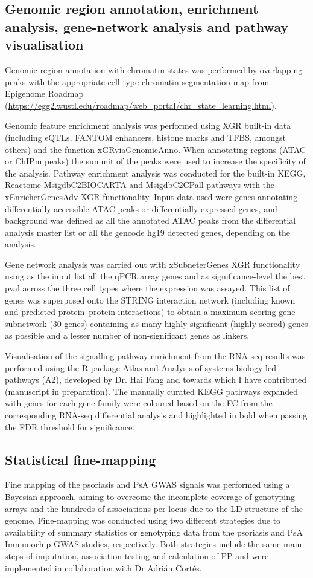 \subsection{Genomic region annotation, enrichment analysis, gene-network analysis and pathway visualisation }
Genomic region annotation with chromatin states was performed by overlapping peaks with the appropriate cell type chromatin segmentation map from Epigenome Roadmap (\url{https://egg2.wustl.edu/roadmap/web_portal/chr_state_learning.html}).

Genomic feature enrichment analysis was performed using XGR built-in data (including eQTLs, FANTOM enhancers, histone marks and TFBS, amongst others) and the function xGRviaGenomicAnno. When annotating regions (ATAC or ChIPm peaks) the summit of the peaks were used to increase the specificity of the analysis. Pathway enrichment analysis was conducted for the built-in KEGG, Reactome MsigdbC2BIOCARTA and MsigdbC2CPall pathways with the xEnricherGenesAdv XGR functionality. Input data used were genes annotating differentially accessible ATAC peaks or differentially expressed genes, and background was defined as all the annotated ATAC peaks from the differential analysis master list or all the gencode hg19 detected genes, depending on the analysis.

Gene network analysis was carried out with xSubneterGenes XGR functionality using as the input list all the qPCR array genes and as significance-level the best pval across the three cell types where the expression was assayed. This list of genes was superposed onto the STRING interaction network (including known and predicted protein–protein interactions) to obtain a maximum-scoring gene subnetwork (30 genes) containing as many highly significant (highly scored) genes as possible and a lesser number of non-significant genes as linkers.  

Visualisation of the signalling-pathway enrichment from the RNA-seq results was performed using the R package Atlas and Analysis of systems-biology-led pathways (A2), developed by Dr. Hai Fang and towards which I have contributed (manuscript in preparation). The manually curated KEGG pathways expanded with genes for each gene family were coloured based on the FC from the corresponding RNA-seq differential analysis and highlighted in bold when passing the FDR threshold for significance.


\subsection{Statistical fine-mapping}
Fine mapping of the psoriasis and PsA GWAS signals was performed using a Bayesian approach, aiming to overcome the incomplete coverage of genotyping arrays and the hundreds of associations per locus due to the LD structure of the genome. Fine-mapping was conducted using two different strategies due to availability of summary statistics or genotyping data from the psoriasis and PsA Immunochip GWAS studies, respectively. Both strategies include the same main steps of imputation, association testing and calculation of PP and were implemented in collaboration with Dr Adri\'{a}n Cort\'{e}s.

